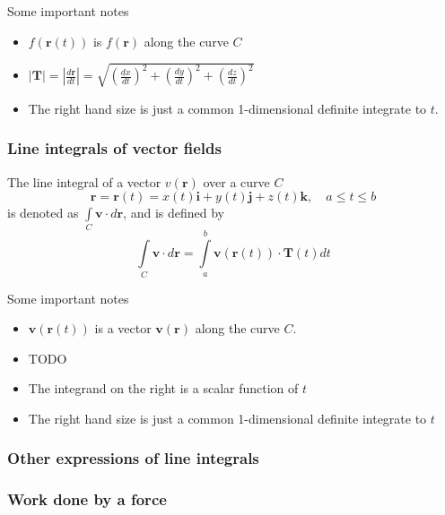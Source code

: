 \documentclass[12pt]{article}
\begin{document}
		Some important notes
		\begin{itemize}	
			\item $f(\mathbf{r}(t))$ is $f(\mathbf{r})$ along the curve $C$
			\item $|\mathbf{T}| = \left| \frac{d\mathbf{r}}{dt} \right| = \sqrt{ \left( \frac{dx}{dt} \right)^2 + \left( \frac{dy}{dt} \right)^2 + \left( \frac{dz}{dt} \right)^2 }$
			\item The right hand size is just a common 1-dimensional definite integrate to $t$.
		\end{itemize}
		
		\subsubsection{Line integrals of vector fields}
		\begin{defn}
			The line integral of a vector $v(\mathbf{r})$ over a curve $C$
			\[
				\mathbf{r} = \mathbf{r}(t) = x(t)\mathbf{i} + y(t)\mathbf{j} + z(t)\mathbf{k}, \quad a \le t \le b
			\]
			is denoted as $\int\limits_C \mathbf{v} \cdot d\mathbf{r}$, and is defined by
			\[
				\int\limits_C \mathbf{v} \cdot d\mathbf{r} = \int\limits_a^b \mathbf{v}(\mathbf{r}(t)) \cdot \mathbf{T}(t) dt
			\]
		\end{defn}
		
		Some important notes
		\begin{itemize}
			\item $\mathbf{v}(\mathbf{r}(t))$ is a vector $\mathbf{v}(\mathbf{r})$ along the curve $C$.
			\item TODO
			\item The integrand on the right is a scalar function of $t$
			\item The right hand size is just a common 1-dimensional definite integrate to $t$
		\end{itemize}
		
		\subsubsection{Other expressions of line integrals}
		\subsubsection{Work done by a force}
	
\end{document}
